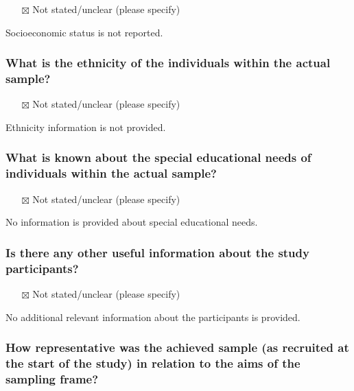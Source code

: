 \documentclass[
  doc, a4paper]{apa7}
\providecommand{\tightlist}{%
  \setlength{\itemsep}{0pt}\setlength{\parskip}{0pt}}
\begin{document}
\begin{itemize}
\tightlist
\item[$\boxtimes$]
  Not stated/unclear (please specify)
\end{itemize}

Socioeconomic status is not reported.

\subsubsection{What is the ethnicity of the individuals within the actual sample?}\label{what-is-the-ethnicity-of-the-individuals-within-the-actual-sample}

\begin{itemize}
\tightlist
\item[$\boxtimes$]
  Not stated/unclear (please specify)
\end{itemize}

Ethnicity information is not provided.

\subsubsection{What is known about the special educational needs of individuals within the actual sample?}\label{what-is-known-about-the-special-educational-needs-of-individuals-within-the-actual-sample}

\begin{itemize}
\tightlist
\item[$\boxtimes$]
  Not stated/unclear (please specify)
\end{itemize}

No information is provided about special educational needs.

\subsubsection{Is there any other useful information about the study participants?}\label{is-there-any-other-useful-information-about-the-study-participants}

\begin{itemize}
\tightlist
\item[$\boxtimes$]
  Not stated/unclear (please specify)
\end{itemize}

No additional relevant information about the participants is provided.

\subsubsection{How representative was the achieved sample (as recruited at the start of the study) in relation to the aims of the sampling frame?}\label{how-representative-was-the-achieved-sample-as-recruited-at-the-start-of-the-study-in-relation-to-the-aims-of-the-sampling-frame}
\end{document}
